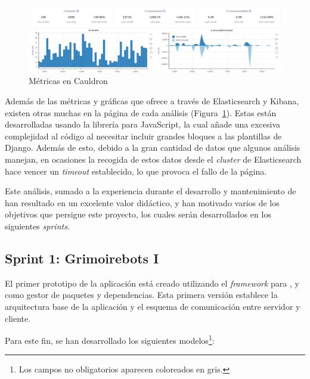 \begin{figure}[ht]
    \centering
    \includegraphics[width=\textwidth]{Figures/cauldron-metrics-charts}
    \decoRule
    \caption[Cauldron (Métricas)]{Métricas en Cauldron}
    \label{fig:cauldron-metrics-charts}
\end{figure}

Además de las métricas y gráficas que  ofrece a través de Elasticsearch y Kibana, existen otras muchas en la página de cada análisis (Figura~\ref{fig:cauldron-metrics-charts}). Estas están desarrolladas usando la librería  para JavaScript, la cual añade una excesiva complejidad al código al necesitar incluir grandes bloques a las plantillas de Django. Además de esto, debido a la gran cantidad de datos que algunos análisis manejan, en ocasiones la recogida de estos datos desde el \emph{cluster} de Elasticsearch hace vencer un \emph{timeout} establecido, lo que provoca el fallo de la página.

Este análisis, sumado a la experiencia durante el desarrollo y mantenimiento de  han resultado en un excelente valor didáctico, y han motivado varios de los objetivos que persigue este proyecto, los cuales serán desarrollados en los siguientes \emph{sprints}.

\subsection{Sprint 1: Grimoirebots I}

El primer prototipo de la aplicación está creado utilizando el \emph{framework}  para , y  como gestor de paquetes y dependencias. Esta primera versión establece la arquitectura base de la aplicación y el esquema de comunicación entre servidor y cliente.

Para este fin, se han desarrollado los siguientes modelos\footnote{Los campos no obligatorios aparecen coloreados en gris.}:

